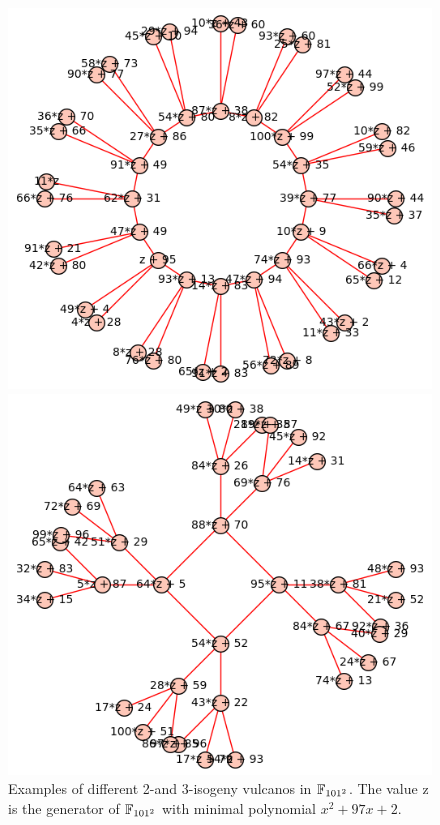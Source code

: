 \begin{figure}
\begin{minipage}{0.5\textwidth}
    \end{minipage}
    \begin{minipage}{0.5\textwidth}
        \includegraphics[width = \textwidth]{../example_II.png}
    \end{minipage}%
    \begin{minipage}{0.5\textwidth}
        \includegraphics[width = \textwidth]{../example_III.png}
    \end{minipage}
    \caption{
        \label{fig:example_vulcanos} Examples of different 2-and 3-isogeny vulcanos in $\mathbb{F}_{101^2}$. 
        The value $\mathrm{z}$ is the generator of $\mathbb{F}_{101^2}$ with minimal polynomial $x^2 + 97x + 2$.
    }
\end{figure}

